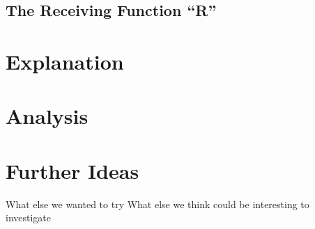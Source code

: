 \documentclass{article}
\begin{document}
\subsection{The Receiving Function “R”}



\section{Explanation}



\section{Analysis}



\section{Further Ideas}
What else we wanted to try
What else we think could be interesting to investigate
\end{document}
